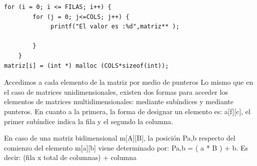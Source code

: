 \documentclass[12pt,oneside]{article}
\begin{document}
\begin{itemize}
\begin{lstlisting}[frame = single]
for (i = 0; i <= FILAS; i++) {
		for (j = 0; j<=COLS; j++) {
		     printf("El valor es :%d",matriz** );

		}						
	}
matriz[i] = (int *) malloc (COLS*sizeof(int));

							\end{lstlisting}


Accedimos a cada elemento de la matriz por medio de punteros 
Lo mismo que en el caso de matrices unidimensionales, existen dos formas para acceder los elementos de matrices multidimensionales: mediante subíndices y mediante punteros. En cuanto a la primera, la forma de designar un elemento es: a[f][c], el primer subíndice indica la fila y el segundo la columna.

En caso de una matriz bidimensional m[A][B], la posición Pa,b respecto del comienzo del elemento m[a][b] viene determinado por: Pa,b = ( a * B ) + b. Es decir: (fila x total de columnas) + columna







						
\end{itemize}
\end{document}
